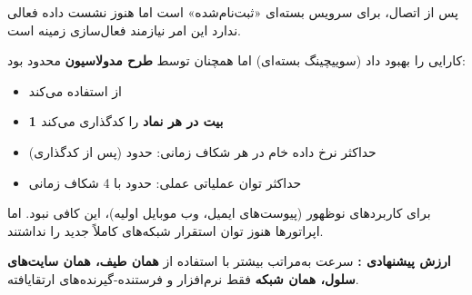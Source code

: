 پس از اتصال،  برای سرویس بسته‌ای «ثبت‌نام‌شده» است اما هنوز نشست داده فعالی ندارد  این امر نیازمند فعال‌سازی زمینه  است.



\CNchained{}

 کارایی را بهبود داد (سوییچینگ بسته‌ای) اما همچنان توسط \textbf{طرح مدولاسیون } محدود بود:

\begin{itemize}
\tightlist
\item
   از  استفاده می‌کند
\item
   \textbf{1 بیت در هر نماد} را کدگذاری می‌کند
\item
  حداکثر نرخ داده خام در هر شکاف زمانی: حدود  (پس از کدگذاری)
\item
  حداکثر توان عملیاتی عملی: حدود  با 4 شکاف زمانی
\end{itemize}

برای کاربردهای نوظهور (پیوست‌های ایمیل، وب موبایل اولیه)، این کافی نبود. اما اپراتورها هنوز توان استقرار شبکه‌های  کاملاً جدید را نداشتند.

\textbf{ارزش پیشنهادی :} سرعت به‌مراتب بیشتر با استفاده از \textbf{همان طیف، همان سایت‌های سلول، همان شبکه}  فقط نرم‌افزار و فرستنده-گیرنده‌های ارتقایافته.




\CNchained{}

